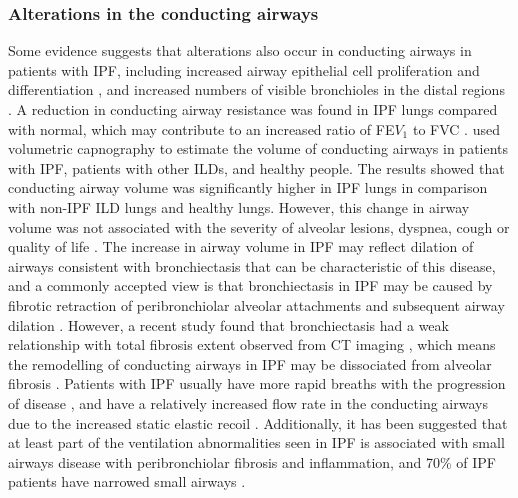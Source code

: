 \subsubsection{Alterations in the conducting airways}
Some evidence suggests that alterations also occur in conducting airways in patients with IPF, including increased airway epithelial cell proliferation \citep{vuorinen2008peroxiredoxin} and differentiation \citep{plantier2016increased}, and increased numbers of visible bronchioles in the distal regions \citep{chilosi2002abnormal}. A reduction in conducting airway resistance was found in IPF lungs compared with normal, which may contribute to an increased ratio of FE$V_1$ to FVC \citep{pastre2015different}. \cite{plantier2016increased} used volumetric capnography to estimate the volume of conducting airways in patients with IPF, patients with other ILDs, and healthy people. The results showed that conducting airway volume was significantly higher in IPF lungs in comparison with non-IPF ILD lungs and healthy lungs. However, this change in airway volume was not associated with the severity of alveolar lesions, dyspnea, cough or quality of life \citep{plantier2016increased}. The increase in airway volume in IPF may reflect dilation of airways consistent with bronchiectasis that can be characteristic of this disease, and a commonly accepted view is that bronchiectasis in IPF may be caused by fibrotic retraction of peribronchiolar alveolar attachments and subsequent airway dilation \citep{sumikawa2008computed}. However, a recent study found that bronchiectasis had a weak relationship with total fibrosis extent observed from CT imaging \citep{walsh2015relationship}, which means the remodelling of conducting airways in IPF may be dissociated from alveolar fibrosis \citep{plantier2016increased}. Patients with IPF usually have more rapid breaths with the progression of disease \citep{ kornbluth1980respiratory, renzi1982pattern}, and have a relatively increased flow rate in the conducting airways due to the increased static elastic recoil \citep{american2000idiopathic}. Additionally, it has been suggested that at least part of the ventilation abnormalities seen in IPF is associated with small airways disease with peribronchiolar fibrosis and inflammation, and 70\% of IPF patients have narrowed small airways \citep{crystal1976idiopathic}.

